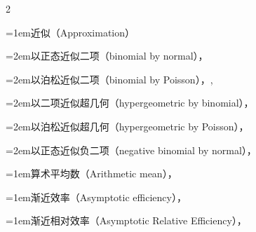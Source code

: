\begin{multicols}{2}
\par\addvspace{2pt}
\par\noindent\hangindent=1em\hspace*{0em}\label{idx:58}近似（Approximation）\par
\par\noindent\hangindent=2em\hspace*{1em}\label{idx:59}以正态近似二项（binomial by normal），\hyperref[ex:3.3.2]{\pageref*{ex:3.3.2}}\par
\par\noindent\hangindent=2em\hspace*{1em}\label{idx:60}以泊松近似二项（binomial by Poisson），\hyperref[ex:2.3.13]{\pageref*{ex:2.3.13}}, \hyperref[eq:3.2.8]{\pageref*{eq:3.2.8}}\par
\par\noindent\hangindent=2em\hspace*{1em}\label{idx:61}以二项近似超几何（hypergeometric by binomial），\hyperref[idxocc:61:137]{\pageref*{idxocc:61:137}}\par
\par\noindent\hangindent=2em\hspace*{1em}\label{idx:62}以泊松近似超几何（hypergeometric by Poisson），\hyperref[itm:exercise:3.11:b]{\pageref*{itm:exercise:3.11:b}}\par
\par\noindent\hangindent=2em\hspace*{1em}\label{idx:63}以正态近似负二项（negative binomial by normal），\hyperref[ex:5.5.16]{\pageref*{ex:5.5.16}}\par
\par\addvspace{2pt}
\par\noindent\hangindent=1em\hspace*{0em}\label{idx:64}算术平均数（Arithmetic mean），\hyperref[ex:4.7.8]{\pageref*{ex:4.7.8}}\par
\par\addvspace{2pt}
\par\noindent\hangindent=1em\hspace*{0em}\label{idx:65}渐近效率（Asymptotic efficiency），\hyperref[def:10.1.11]{\pageref*{def:10.1.11}}\par
\par\addvspace{2pt}
\par\noindent\hangindent=1em\hspace*{0em}\label{idx:66}渐近相对效率（Asymptotic Relative Efficiency），\hyperref[def:10.1.16]{\pageref*{def:10.1.16}}\par

\end{multicols}
